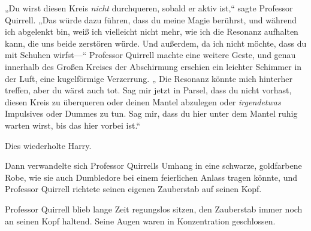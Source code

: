 „Du wirst diesen Kreis \emph{nicht} durchqueren, sobald er aktiv ist,“ sagte Professor Quirrell. „Das würde dazu führen, dass du meine Magie berührst, und während ich abgelenkt bin, weiß ich vielleicht nicht mehr, wie ich die Resonanz aufhalten kann, die uns beide zerstören würde. Und außerdem, da ich nicht möchte, dass du mit Schuhen wirfst—“ Professor Quirrell machte eine weitere Geste, und genau innerhalb des Großen Kreises der Abschirmung erschien ein leichter Schimmer in der Luft, eine kugelförmige Verzerrung. „ Die Resonanz könnte mich hinterher treffen, aber du wärst auch tot. Sag mir jetzt in Parsel, dass du nicht vorhast, diesen Kreis zu überqueren oder deinen Mantel abzulegen oder \emph{irgendetwas} Impulsives oder Dummes zu tun. Sag mir, dass du hier unter dem Mantel ruhig warten wirst, bis das hier vorbei ist.“

Dies wiederholte Harry.

Dann verwandelte sich Professor Quirrells Umhang in eine schwarze, goldfarbene Robe, wie sie auch Dumbledore bei einem feierlichen Anlass tragen könnte, und Professor Quirrell richtete seinen eigenen Zauberstab auf seinen Kopf.

Professor Quirrell blieb lange Zeit regungslos sitzen, den Zauberstab immer noch an seinen Kopf haltend. Seine Augen waren in Konzentration geschlossen.

